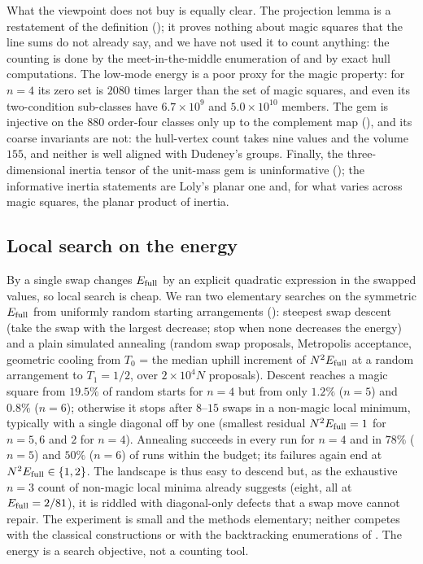 What the viewpoint does not buy is equally clear.
The projection lemma is a restatement of the definition (); it proves nothing about magic squares that the line sums do not already say, and we have not used it to count anything: the counting is done by the meet-in-the-middle enumeration of  and by exact hull computations.
The low-mode energy is a poor proxy for the magic property: for $n=4$ its zero set is $2080$ times larger than the set of magic squares, and even its two-condition sub-classes have $6.7\times10^9$ and $5.0\times10^{10}$ members.
The gem is injective on the $880$ order-four classes only up to the complement map (), and its coarse invariants are not: the hull-vertex count takes nine values and the volume $155$, and neither is well aligned with Dudeney's groups.
Finally, the three-dimensional inertia tensor of the unit-mass gem is uninformative (); the informative inertia statements are Loly's planar one and, for what varies across magic squares, the planar product of inertia.

\subsection{Local search on the energy}
\label{sec:algorithms}

By  a single swap changes $E_{\mathrm{full}}$ by an explicit quadratic expression in the swapped values, so local search is cheap.
We ran two elementary searches on the symmetric $E_{\mathrm{full}}$ from uniformly random starting arrangements (): steepest swap descent (take the swap with the largest decrease; stop when none decreases the energy) and a plain simulated annealing (random swap proposals, Metropolis acceptance, geometric cooling from $T_0$ = the median uphill increment of $N^2E_{\mathrm{full}}$ at a random arrangement to $T_1=1/2$, over $2\times10^4N$ proposals).
Descent reaches a magic square from $19.5\%$ of random starts for $n=4$ but from only $1.2\%$ ($n=5$) and $0.8\%$ ($n=6$); otherwise it stops after $8$--$15$ swaps in a non-magic local minimum, typically with a single diagonal off by one (smallest residual $N^2E_{\mathrm{full}}=1$ for $n=5,6$ and $2$ for $n=4$).
Annealing succeeds in every run for $n=4$ and in $78\%$ ($n=5$) and $50\%$ ($n=6$) of runs within the budget; its failures again end at $N^2E_{\mathrm{full}}\in\{1,2\}$.
The landscape is thus easy to descend but, as the exhaustive $n=3$ count of non-magic local minima already suggests (eight, all at $E_{\mathrm{full}}=2/81$), it is riddled with diagonal-only defects that a swap move cannot repair.
The experiment is small and the methods elementary; neither competes with the classical constructions or with the backtracking enumerations of \cite{beck2010enumeration,trump2012enumeration}. The energy is a search objective, not a counting tool.


